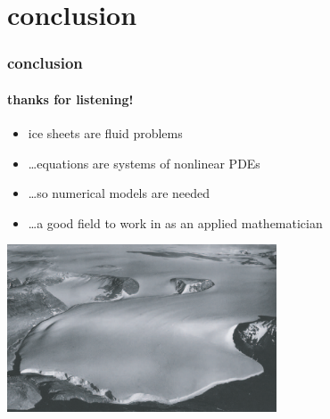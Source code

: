 \documentclass[10pt,hyperref={pdfpagelabels=true}]{beamer}
\begin{document}
\section*{conclusion}

\begin{frame}
  \frametitle{conclusion}
  \framesubtitle{thanks for listening!}

\begin{itemize}
\item ice sheets are fluid problems
\item \dots equations are systems of nonlinear PDEs
\item \dots so numerical models are needed
\item \dots a good field to work in as an applied mathematician
\end{itemize}

\begin{center}
\includegraphics[width=0.6\textwidth]{polaris}
\end{center}
\end{frame}
\end{document}
